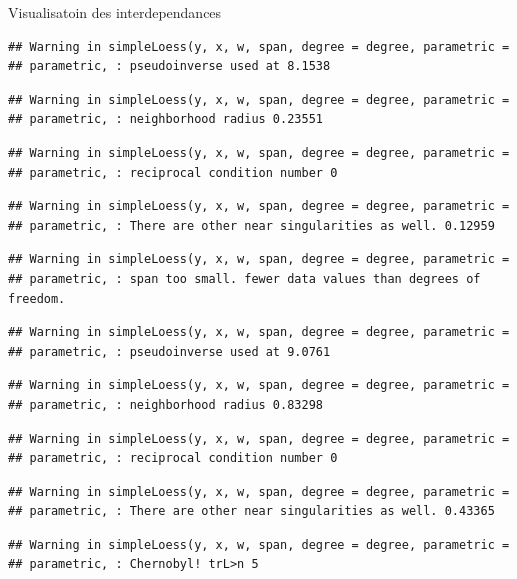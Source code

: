 \documentclass[11pt,ignorenonframetext,]{beamer}
\begin{document}
\begin{frame}[fragile]{Visualisatoin des interdependances}
\begin{verbatim}
## Warning in simpleLoess(y, x, w, span, degree = degree, parametric =
## parametric, : pseudoinverse used at 8.1538
\end{verbatim}

\begin{verbatim}
## Warning in simpleLoess(y, x, w, span, degree = degree, parametric =
## parametric, : neighborhood radius 0.23551
\end{verbatim}

\begin{verbatim}
## Warning in simpleLoess(y, x, w, span, degree = degree, parametric =
## parametric, : reciprocal condition number 0
\end{verbatim}

\begin{verbatim}
## Warning in simpleLoess(y, x, w, span, degree = degree, parametric =
## parametric, : There are other near singularities as well. 0.12959
\end{verbatim}

\begin{verbatim}
## Warning in simpleLoess(y, x, w, span, degree = degree, parametric =
## parametric, : span too small. fewer data values than degrees of freedom.
\end{verbatim}

\begin{verbatim}
## Warning in simpleLoess(y, x, w, span, degree = degree, parametric =
## parametric, : pseudoinverse used at 9.0761
\end{verbatim}

\begin{verbatim}
## Warning in simpleLoess(y, x, w, span, degree = degree, parametric =
## parametric, : neighborhood radius 0.83298
\end{verbatim}

\begin{verbatim}
## Warning in simpleLoess(y, x, w, span, degree = degree, parametric =
## parametric, : reciprocal condition number 0
\end{verbatim}

\begin{verbatim}
## Warning in simpleLoess(y, x, w, span, degree = degree, parametric =
## parametric, : There are other near singularities as well. 0.43365
\end{verbatim}

\begin{verbatim}
## Warning in simpleLoess(y, x, w, span, degree = degree, parametric =
## parametric, : Chernobyl! trL>n 5


\end{verbatim}
\end{frame}
\end{document}
